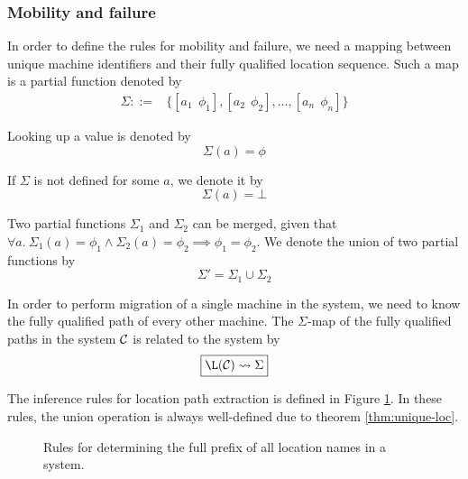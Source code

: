 \newpage

\subsubsection{Mobility and failure}

In order to define the rules for mobility and failure, we need a mapping between
unique machine identifiers and their fully qualified location sequence. Such a
map is a partial function denoted by
\begin{align*}
\Sigma ::={}&
    \{[a_1~~\phi_1], [a_2~~\phi_2], ..., [a_n~~\phi_n]\}
\end{align*}

Looking up a value is denoted by
\begin{equation*}
 \Sigma(a) = \phi
\end{equation*}

If $\Sigma$ is not defined for some $a$, we denote it by
\begin{equation*}
 \Sigma(a) = \bot
\end{equation*}

Two partial functions $\Sigma_1$ and $\Sigma_2$ can be merged, given that
$\forall a.~ \Sigma_1(a) = \phi_1 \land \Sigma_2(a) = \phi_2 \implies \phi_1 =
\phi_2$. We denote the union of two partial functions by
\begin{equation*}
 \Sigma' = \Sigma_1 \cup \Sigma_2
\end{equation*}

In order to perform migration of a single machine in the system, we need to
know the fully qualified path of every other machine. The $\Sigma$-map of the
fully qualified paths in the system $\mathcal{C}$ is related to the system by
\begin{equation*}
\boxed{\L(\C) \leadsto \Sigma}
\end{equation*}

The inference rules for location path extraction is defined in Figure
\ref{fig:rule:makemap}. In these rules, the union operation is always
well-defined due to theorem \ref{thm:unique-loc}.

\begin{figure}[!h]
\caption{Rules for determining the full prefix of all location names in a
system.}\label{fig:rule:makemap}
\end{figure}

